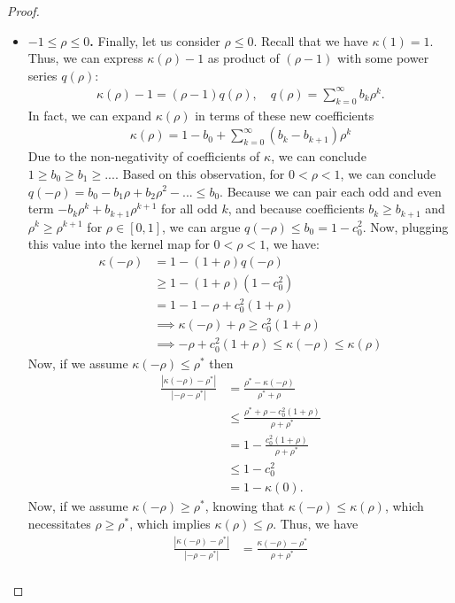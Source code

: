 \documentclass[twoside]{article}
\theoremstyle{definition}
\begin{document}
\begin{proof}
\begin{itemize}
\item \textbf{$-1 \le \rho \le 0$.}
Finally, let us consider $\rho \le 0$. 
Recall that we have $\kappa(1) = 1$. Thus, we can express $\kappa(\rho)-1$ as product of $(\rho-1)$ with some power series $q(\rho)$:
\begin{align*}
\kappa(\rho) - 1 = (\rho-1)q(\rho), \quad q(\rho) = \sum_{k=0}^\infty b_k \rho^k.
\end{align*}
In fact, we can expand $\kappa(\rho)$ in terms of these new coefficients
\begin{align*}
\kappa(\rho) = 1-b_0 + \sum_{k=0}^\infty (b_k - b_{k+1}) \rho^k
\end{align*}
Due to the non-negativity of coefficients of $\kappa$, we can conclude $1\ge b_0 \ge b_1 \ge ...$. Based on this observation, for $0 < \rho < 1$, we can conclude
$q(-\rho) = b_0 - b_1 \rho + b_2 \rho^2 - ... \le b_0$. Because we can pair each odd and even term $-b_{k}\rho^k + b_{k+1} \rho^{k+1}$ for all odd $k$, and because coefficients $b_k \ge b_{k+1}$ and $\rho^{k} \ge \rho^{k+1}$ for $\rho \in [0,1]$, we can argue $q(-\rho) \le b_0 = 1 - c_0^2$. Now, plugging this value into the kernel map for $0 < \rho < 1$, we have:
\begin{align*}
\kappa(-\rho) &= 1 - (1+\rho)q(-\rho) \\
&\ge 1-(1+\rho)(1-c_0^2)\\
&= 1 - 1 - \rho + c_0^2 (1+\rho)\\
&\implies \kappa(-\rho) + \rho \ge c_0^2 (1+\rho)\\
&\implies -\rho + c_0^2(1+\rho) \le \kappa(-\rho) \le \kappa(\rho)
\end{align*}
Now, if we assume $\kappa(-\rho) \le \rho^*$ then
\begin{align*}
\frac{|\kappa(-\rho)-\rho^*|}{|-\rho-\rho^*|}&=\frac{\rho^* - \kappa(-\rho)}{\rho^* + \rho} \\
&\le \frac{\rho^* + \rho - c_0^2 (1+\rho)}{\rho+\rho^*} \\
&= 1- \frac{c_0^2(1+\rho)}{\rho+\rho^*} \\
&\le 1-c_0^2\\
&= 1 - \kappa(0).
\end{align*}
Now, if we assume $\kappa(-\rho) \ge \rho^*$, knowing that $\kappa(-\rho)\le \kappa(\rho)$, which necessitates $\rho\ge \rho^*$, which implies $\kappa(\rho)\le \rho$. Thus, we have
\begin{align*}
\frac{|\kappa(-\rho)-\rho^*|}{|-\rho-\rho^*|} &= \frac{\kappa(-\rho)-\rho^*}{\rho+\rho^*}\\

\end{align*}
\end{itemize}
\end{proof}
\end{document}
